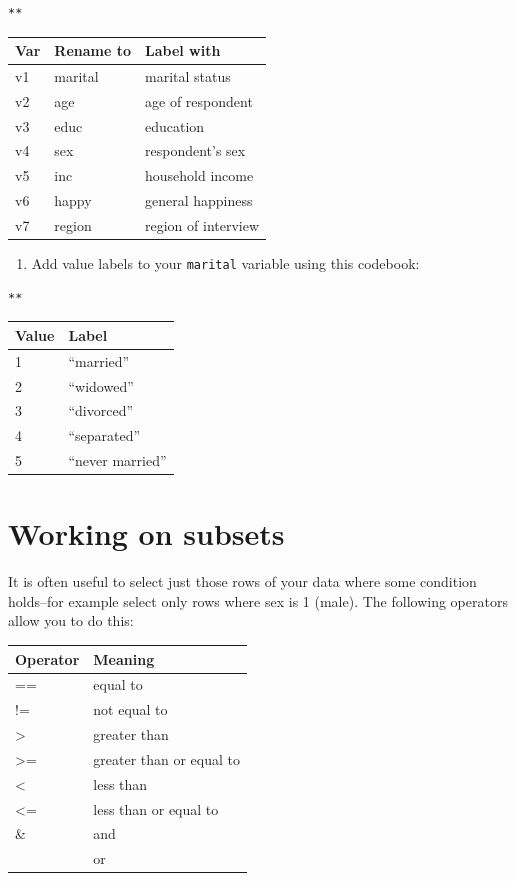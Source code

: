 \documentclass[]{book}
\providecommand{\tightlist}{%
  \setlength{\itemsep}{0pt}\setlength{\parskip}{0pt}}
\begin{document}
\begin{verbatim}
**
\end{verbatim}

\begin{longtable}[]{@{}lll@{}}
\toprule
Var & Rename to & Label with\tabularnewline
\midrule
\endhead
v1 & marital & marital status\tabularnewline
v2 & age & age of respondent\tabularnewline
v3 & educ & education\tabularnewline
v4 & sex & respondent's sex\tabularnewline
v5 & inc & household income\tabularnewline
v6 & happy & general happiness\tabularnewline
v7 & region & region of interview\tabularnewline
\bottomrule
\end{longtable}

\begin{enumerate}
\def\labelenumi{\arabic{enumi}.}
\setcounter{enumi}{2}
\tightlist
\item
  Add value labels to your \texttt{marital} variable using this codebook:
\end{enumerate}

\begin{verbatim}
**
\end{verbatim}

\begin{longtable}[]{@{}ll@{}}
\toprule
Value & Label\tabularnewline
\midrule
\endhead
1 & ``married''\tabularnewline
2 & ``widowed''\tabularnewline
3 & ``divorced''\tabularnewline
4 & ``separated''\tabularnewline
5 & ``never married''\tabularnewline
\bottomrule
\end{longtable}

\hypertarget{working-on-subsets}{%
\section{Working on subsets}\label{working-on-subsets}}

It is often useful to select just those rows of your data where some condition holds--for example select only rows where sex is 1 (male).
The following operators allow you to do this:

\begin{longtable}[]{@{}ll@{}}
\toprule
Operator & Meaning\tabularnewline
\midrule
\endhead
== & equal to\tabularnewline
!= & not equal to\tabularnewline
\textgreater{} & greater than\tabularnewline
\textgreater{}= & greater than or equal to\tabularnewline
\textless{} & less than\tabularnewline
\textless{}= & less than or equal to\tabularnewline
\& & and\tabularnewline
\textbar{} & or\tabularnewline
\bottomrule
\end{longtable}
\end{document}

